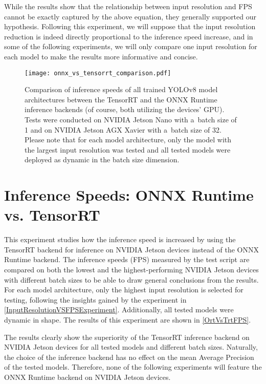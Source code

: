 While the results show that the relationship between input resolution and
FPS cannot be exactly captured by the above equation, they generally
supported our hypothesis. Following this experiment, we will suppose that the
input resolution reduction is indeed directly proportional to the inference
speed increase, and in some of the following experiments, we will only compare
one input resolution for each model to make the results more informative and
concise.





\begin{figure}[H]
        \centering
        \texttt{[image: onnx\_vs\_tensorrt\_comparison.pdf]}
        \caption{Comparison of inference speeds of all trained YOLOv8 model
        architectures between the TensorRT and the ONNX Runtime inference
        backends (of course, both utilizing the devices' GPU). Tests were
        conducted on NVIDIA Jetson Nano with a~batch size of 1 and on NVIDIA
        Jetson AGX Xavier with a~batch size of 32. Please note that for each
        model architecture, only the model with the largest input resolution was
        tested and all tested models were deployed as dynamic in the batch size
        dimension.}
        \label{OrtVsTrtFPS}
\end{figure}

\section{Inference Speeds: ONNX Runtime vs. TensorRT}

This experiment studies how the inference speed is increased by using the
TensorRT backend for inference on NVIDIA Jetson devices instead of the ONNX
Runtime backend. The inference speeds (FPS) measured by the test script are
compared on both the lowest and the highest-performing NVIDIA Jetson devices
with different batch sizes to be able to draw general conclusions from the
results. For each model architecture, only the highest input resolution is
selected for testing, following the insights gained by the experiment in
\autoref{InputResolutionVSFPSExperiment}. Additionally, all tested models were
dynamic in shape. The results of this experiment are shown in
\autoref{OrtVsTrtFPS}.


The results clearly show the superiority of the TensorRT inference backend on
NVIDIA Jetson devices for all tested models and different batch sizes.
Naturally, the choice of the inference backend has no effect on the mean Average
Precision of the tested models. Therefore, none of the following experiments
will feature the ONNX Runtime backend on NVIDIA Jetson devices.

